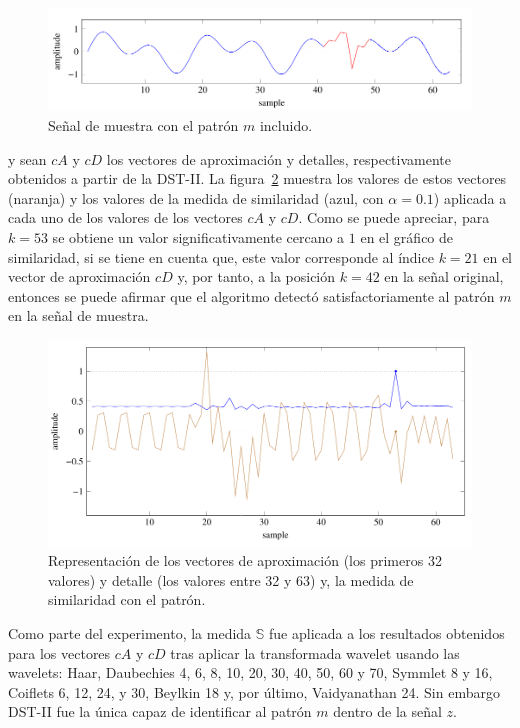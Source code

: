 \begin{figure}[h]
\center
\includegraphics[scale=.4]{Graphics/Signal.png}
\caption{Se\~nal de muestra con el patr\'on $m$ incluido.}
\label{signal-1d}
\end{figure}

y sean $cA$ y $cD$ los vectores de aproximaci\'on y detalles, respectivamente obtenidos a partir de la DST-II. La figura~\ref{similaridad-1d} muestra los valores de estos vectores (naranja) y los valores de la medida de similaridad (azul, con $\alpha=0.1$) aplicada a cada uno de los valores de los vectores $cA$ y $cD$. Como se puede apreciar, para $k=53$ se obtiene un valor significativamente cercano a $1$ en el gr\'afico de similaridad, si se tiene en cuenta que, este valor corresponde al \'indice $k=21$ en el vector de aproximaci\'on $cD$ y, por tanto, a la posici\'on $k=42$ en la se\~nal original, entonces se puede afirmar que el algoritmo detect\'o satisfactoriamente al patr\'on $m$ en la se\~nal de muestra.

\begin{figure}[h]
\center
\includegraphics[scale=.4]{Graphics/Similarity.png}
\caption{Representaci\'on de los vectores de aproximaci\'on (los primeros 32 valores) y detalle (los valores entre 32 y 63) y, la medida de similaridad con el patr\'on.}
\label{similaridad-1d}
\end{figure}

\par Como parte del experimento, la medida $\mathbb{S}$ fue aplicada a los resultados obtenidos para los vectores $cA$ y $cD$ tras aplicar la transformada wavelet usando las wavelets: Haar, Daubechies 4, 6, 8, 10, 20, 30, 40, 50, 60 y 70, Symmlet 8 y 16, Coiﬂets 6, 12, 24, y 30, Beylkin 18 y, por \'ultimo, Vaidyanathan 24. Sin embargo DST-II fue la \'unica capaz de identificar al patr\'on $m$ dentro de la se\~nal $z$.

